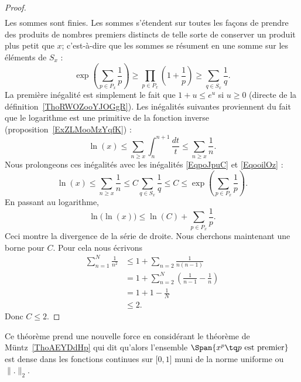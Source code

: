 \begin{proof}
\begin{subequations}
\begin{align}
        \end{align}
    \end{subequations}
    Les sommes sont finies. Les sommes s'étendent sur toutes les façons de prendre des produits de nombres premiers distincts de telle sorte de conserver un produit plus petit que \( x\); c'est-à-dire que les sommes se résument en une somme sur les éléments de \( S_x\) :
    \begin{equation}        \label{EqooilOz}
        \exp\left( \sum_{p\in P_x}\frac{1}{ p } \right)\geq\prod_{p\in P_x}\left( 1+\frac{1}{ p } \right)\geq \sum_{q\in S_x}\frac{1}{ q }.
    \end{equation}
    La première inégalité est simplement le fait que \( 1+u\leq e^u\) si \( u\geq 0\) (directe de la définition~\ref{ThoRWOZooYJOGgR}). Les inégalités suivantes proviennent du fait que le logarithme est une primitive de la fonction inverse (proposition~\ref{ExZLMooMzYqfK}) :
    \begin{equation}
        \ln(x)\leq \sum_{n\geq x}\int_{n}^{n+1}\frac{dt}{ t }\leq \sum_{n\geq x}\frac{1}{ n }.
    \end{equation}
    Nous prolongeons ces inégalités avec les inégalités \eqref{EqpoJpuC} et \eqref{EqooilOz} :
    \begin{equation}
        \ln(x)\leq \sum_{n\geq x}\frac{1}{ n }\leq C\sum_{q\in S_x}\frac{1}{ q }\leq C\leq \exp\left( \sum_{p\in P_x}\frac{1}{ p } \right).
    \end{equation}
    En passant au logarithme,
    \begin{equation}
        \ln\big( \ln(x) \big)\leq\ln(C)+\sum_{p\in P_x}\frac{1}{ p }.
    \end{equation}
    Ceci montre la divergence de la série de droite. Nous cherchons maintenant une borne pour \( C\). Pour cela nous écrivons
    \begin{subequations}
        \begin{align}
            \sum_{n=1}^N\frac{1}{ n^2 }&\leq 1+\sum_{n=2}\frac{1}{ n(n-1) }\\
            &=1+\sum_{n=2}^N\left( \frac{1}{ n-1 }-\frac{1}{ n } \right)\\
            &=1+1-\frac{1}{ N }\\
            &\leq 2.
        \end{align}
    \end{subequations}
    Donc \( C\leq 2\).
\end{proof}
Ce théorème prend une nouvelle force en considérant le théorème de Müntz~\ref{ThoAEYDdHp} qui dit qu'alors l'ensemble \( \Span\{ x^p\tq  p\text{ est premier} \}\) est dense dans les fonctions continues sur \( \mathopen[ 0 , 1 \mathclose]\) muni de la norme uniforme ou \( \| . \|_2\).

